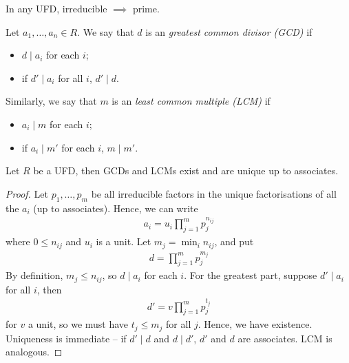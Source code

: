 \documentclass{../template/note}
\begin{document}
    \begin{remark*}
        In any UFD, irreducible $\implies$ prime.
    \end{remark*}
    
    \begin{definition}
        Let $a_1, \dots, a_n \in R$. We say that $d$ is an \emph{greatest common divisor (GCD)} if
        \begin{itemize}
            \item $d \mid a_i$ for each $i$;
            \item if $d' \mid a_i$ for all $i$, $d' \mid d$.
        \end{itemize}
        Similarly, we say that $m$ is an \emph{least common multiple (LCM)} if
        \begin{itemize}
            \item $a_i \mid m$ for each $i$;
            \item if $a_i \mid m'$ for each $i$, $m \mid m'$.
        \end{itemize}
    \end{definition}
    
    \begin{theorem}
        Let $R$ be a UFD, then GCDs and LCMs exist and are unique up to associates.
    \end{theorem}
    
    \begin{proof}
        Let $p_1, \dots, p_m$ be all irreducible factors in the unique factorisations of all the $a_i$ (up to associates). Hence, we can write
        \begin{align*}
            a_i = u_i \prod_{j=1}^m p_j^{n_{ij}}
        \end{align*}
        where $0 \leq n_{ij}$ and $u_i$ is a unit. Let $m_j = \min_i n_{ij}$, and put
        \begin{align*}
            d = \prod_{j=1}^m p_j^{m_j}
        \end{align*}
        By definition, $m_j \leq n_{ij}$, so $d \mid a_i$ for each $i$. For the greatest part, suppose $d' \mid a_i$ for all $i$, then
        \begin{align*}
            d' = v \prod_{j=1}^m p_j^{t_j}
        \end{align*}
        for $v$ a unit, so we must have $t_j \leq m_j$ for all $j$. Hence, we have existence. Uniqueness is immediate -- if $d' \mid d$ and $d \mid d'$, $d'$ and $d$ are associates. LCM is analogous.       
    \end{proof}
    
\end{document}
